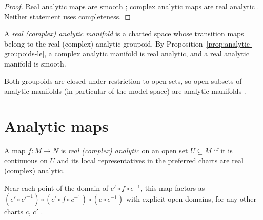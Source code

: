 \begin{proof}
  \leanok
  Real analytic maps are smooth \cite[Lemma~2.2.5]{GN26}; complex analytic maps are real
  analytic \cite[Proposition~2.2.11]{GN26}. Neither statement uses completeness.
\end{proof}

\begin{definition}
  \label{def:analytic-manifold}
  \leanok
  A \emph{real (complex) analytic manifold} is a charted space whose transition maps belong to
  the real (complex) analytic groupoid. By Proposition~\ref{prop:analytic-groupoids-le}, a
  complex analytic manifold is real analytic, and a real analytic manifold is smooth.
\end{definition}

\begin{remark}
  \label{rem:analytic-opens}
  Both groupoids are closed under restriction to open sets, so open subsets of analytic
  manifolds (in particular of the model space) are analytic manifolds
  \cite[Examples~3.1.8 and~3.1.9]{GN26}.
\end{remark}

\section{Analytic maps}

\begin{definition}
  \label{def:analytic-maps}
  \leanok
  A map $f \colon M \to N$ is \emph{real (complex) analytic} on an open set $U \subseteq M$ if
  it is continuous on $U$ and its local representatives in the preferred charts are real
  (complex) analytic.
\end{definition}

\begin{lemma}
  \label{lem:chart-change}
  \leanok
  Near each point of the domain of $e' \circ f \circ e^{-1}$, this map factors as
  $(e' \circ c'^{-1}) \circ (c' \circ f \circ c^{-1}) \circ (c \circ e^{-1})$ with explicit
  open domains, for any other charts $c$, $c'$ \cite[Remark~3.1.5]{GN26}.
\end{lemma}

